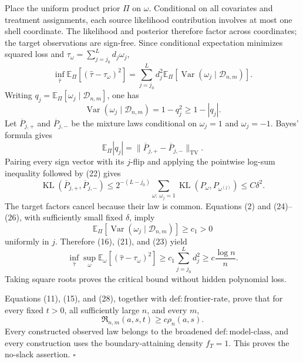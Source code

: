 Place the uniform product prior \(\Pi\) on \(\omega\). Conditional on all covariates and treatment assignments, each source likelihood contribution involves at most one shell coordinate. The likelihood and posterior therefore factor across coordinates; the target observations are sign-free. Since conditional expectation minimizes squared loss and \(\tau_\omega=\sum_{j=j_0}^Ld_j\omega_j\),
\[
 \inf_{\widehat\tau}
 \mathbb E_\Pi[(\widehat\tau-\tau_\omega)^2]
 =\sum_{j=j_0}^Ld_j^2
   \mathbb E_\Pi[\operatorname{Var}(\omega_j\mid\mathcal D_{n,m})].
\tag{23}
\]
Writing \(q_j=\mathbb E_\Pi[\omega_j\mid\mathcal D_{n,m}]\), one has
\[
 \operatorname{Var}(\omega_j\mid\mathcal D_{n,m})
 =1-q_j^2\ge1-|q_j|.
\tag{24}
\]
Let \(\overline P_{j,+}\) and \(\overline P_{j,-}\) be the mixture laws conditional on \(\omega_j=1\) and \(\omega_j=-1\). Bayes' formula gives
\[
 \mathbb E_\Pi|q_j|
 =\lVert\overline P_{j,+}-\overline P_{j,-}\rVert_{\mathrm{TV}}.
\tag{25}
\]
Pairing every sign vector with its \(j\)-flip and applying the pointwise log-sum inequality followed by (22) gives
\[
 \operatorname{KL}(\overline P_{j,+},\overline P_{j,-})
 \le 2^{-(L-j_0)}
 \sum_{\omega:\,\omega_j=1}
 \operatorname{KL}(P_\omega,P_{\omega^{(j)}})
 \le C\delta^2.
\tag{26}
\]
The target factors cancel because their law is common. Equations (2) and (24)--(26), with sufficiently small fixed \(\delta\), imply
\[
 \mathbb E_\Pi[\operatorname{Var}
   (\omega_j\mid\mathcal D_{n,m})]
 \ge c_1>0
\tag{27}
\]
uniformly in \(j\). Therefore (16), (21), and (23) yield
\[
 \inf_{\widehat\tau}\sup_\omega
 \mathbb E_\omega[(\widehat\tau-\tau_\omega)^2]
 \ge c_1\sum_{j=j_0}^Ld_j^2
 \ge c\frac{\log n}{n}.
\tag{28}
\]
Taking square roots proves the critical bound without hidden polynomial loss.

Equations (11), (15), and (28), together with \(\mathrm{def:frontier\text{-}rate}\), prove that for every fixed \(t>0\), all sufficiently large \(n\), and every \(m\),
\[
 \mathfrak R_{n,m}(a,s,t)\ge c\rho_n(a,s).
\]
Every constructed observed law belongs to the broadened \(\mathrm{def:model\text{-}class}\), and every construction uses the boundary-attaining density \(f_T=1\). This proves the no-slack assertion. \(\square\)